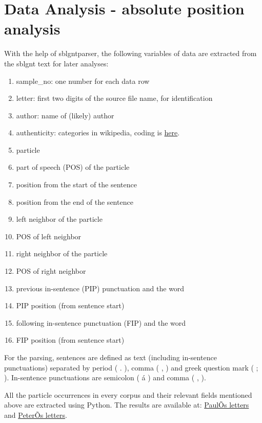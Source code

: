 \documentclass[a4paper]{article}
\begin{document}
\section{Data Analysis - absolute position analysis}
With the help of sblgntparser, the following variables of data are extracted from the sblgnt text for later analyses:
\begin{enumerate}[itemsep=-1mm]
\item sample\_no: one number for each data row
\item letter: first two digits of the source file name, for identification
\item author: name of (likely) author
\item authenticity: categories in wikipedia, coding is \href{https://github.com/KLINGTdotNET/dh-project-ws14/blob/master/data/paul_letters.txt}{here}.
\item particle
\item part of speech (POS) of the particle
\item position from the start of the sentence
\item position from the end of the sentence
\item left neighbor of the particle
\item POS of left neighbor
\item right neighbor of the particle
\item POS of right neighbor
\item previous in-sentence (PIP) punctuation and the word 
\item PIP position (from sentence start)
\item following in-sentence punctuation (FIP) and the word
\item FIP position (from sentence start)
\end{enumerate}

\noindent For the parsing, sentences are defined as text (including in-sentence punctuations) separated by period ( . ), comma ( , ) and greek question mark ( ; ). In-sentence punctuations are semicolon ( á ) and comma ( , ). 

All the particle occurrences in every corpus and their relevant fields mentioned above are extracted using Python. The results are available at: \href{https://github.com/KLINGTdotNET/dh-project-ws14/tree/master/data/output/paul_par}{PaulÕs letters} and \href{https://github.com/KLINGTdotNET/dh-project-ws14/tree/master/data/output/peter_par}{PeterÕs letters}.
\end{document}
